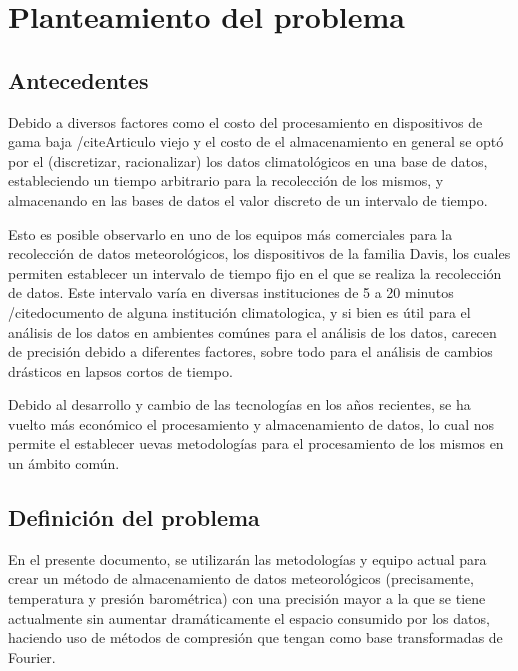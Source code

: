 \section{Planteamiento del problema}



\subsection{Antecedentes}

Debido a diversos factores como el costo del procesamiento en dispositivos de gama baja /cite{Articulo viejo} y el costo de el almacenamiento en general \cite{Marshall_1994} se optó por el (discretizar, racionalizar) los datos climatológicos en una base de datos, estableciendo un tiempo arbitrario para la recolección de los mismos, y almacenando en las bases de datos el valor discreto de un intervalo de tiempo.

Esto es posible observarlo en uno de los equipos más comerciales para la recolección de datos meteorológicos, los dispositivos de la familia Davis, los cuales permiten establecer un intervalo de tiempo fijo en el que se realiza la recolección de datos. Este intervalo varía en diversas instituciones de 5 a 20 minutos /cite{documento de alguna institución climatologica}, y si bien es útil para el análisis de los datos en ambientes comúnes para el análisis de los datos, carecen de precisión debido a diferentes factores, sobre todo para el análisis de cambios drásticos en lapsos cortos de tiempo.

Debido al desarrollo y cambio de las tecnologías en los años recientes, se ha vuelto más económico el procesamiento y almacenamiento de datos, lo cual nos permite el establecer uevas metodologías para el procesamiento de los mismos en un ámbito común.

\subsection{Definición del problema}

En el presente documento, se utilizarán las metodologías y equipo actual para crear un método de almacenamiento de datos meteorológicos (precisamente, temperatura y presión barométrica) con una precisión mayor a la que se tiene actualmente sin aumentar dramáticamente el espacio consumido por los datos, haciendo uso de métodos de compresión que tengan como base transformadas de Fourier.
